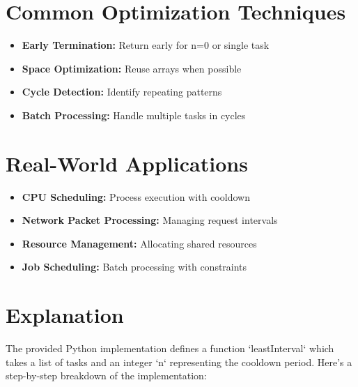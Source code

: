 \section*{Common Optimization Techniques}
\begin{itemize}
    \item \textbf{Early Termination:} Return early for n=0 or single task
    \item \textbf{Space Optimization:} Reuse arrays when possible
    \item \textbf{Cycle Detection:} Identify repeating patterns
    \item \textbf{Batch Processing:} Handle multiple tasks in cycles
\end{itemize}

\section*{Real-World Applications}
\begin{itemize}
    \item \textbf{CPU Scheduling:} Process execution with cooldown
    \item \textbf{Network Packet Processing:} Managing request intervals
    \item \textbf{Resource Management:} Allocating shared resources
    \item \textbf{Job Scheduling:} Batch processing with constraints
\end{itemize}

\section*{Explanation}

The provided Python implementation defines a function `leastInterval` which takes a list of tasks and an integer `n` representing the cooldown period. Here's a step-by-step breakdown of the implementation:


